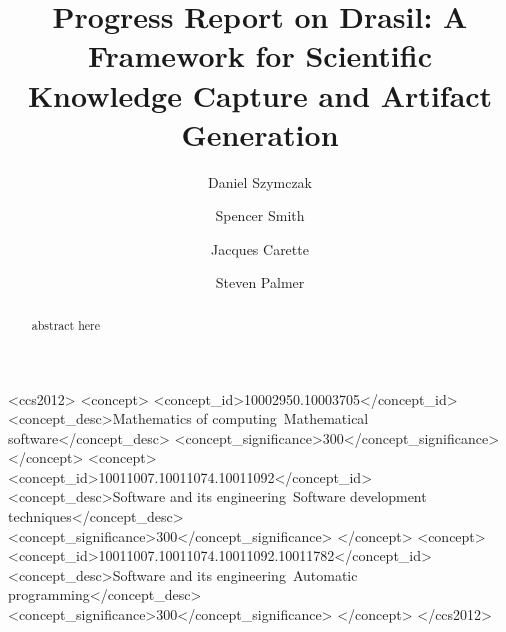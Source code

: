 \documentclass[sigconf]{acmart}
\begin{document}
\title{Progress Report on Drasil: A Framework for Scientific Knowledge Capture and Artifact Generation}

\author{Daniel Szymczak}

\author{Spencer Smith}

\author{Jacques Carette}

\author{Steven Palmer}


\begin{abstract}
abstract here
\end{abstract}

%
%
 \begin{CCSXML}
<ccs2012>
<concept>
<concept_id>10002950.10003705</concept_id>
<concept_desc>Mathematics of computing~Mathematical software</concept_desc>
<concept_significance>300</concept_significance>
</concept>
<concept>
<concept_id>10011007.10011074.10011092</concept_id>
<concept_desc>Software and its engineering~Software development techniques</concept_desc>
<concept_significance>300</concept_significance>
</concept>
<concept>
<concept_id>10011007.10011074.10011092.10011782</concept_id>
<concept_desc>Software and its engineering~Automatic programming</concept_desc>
<concept_significance>300</concept_significance>
</concept>
</ccs2012>
\end{CCSXML}
\end{document}
